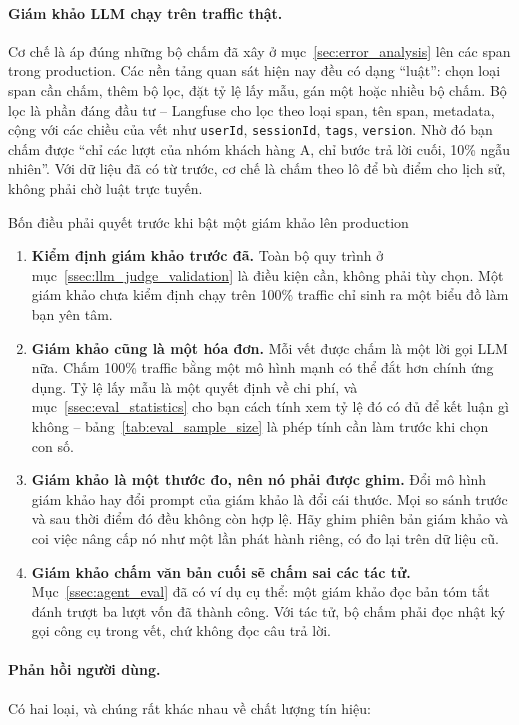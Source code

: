 \paragraph{Giám khảo LLM chạy trên traffic thật.} Cơ chế là áp đúng những bộ chấm đã xây ở mục~\ref{sec:error_analysis} lên các span trong production. Các nền tảng quan sát hiện nay đều có dạng ``luật'': chọn loại span cần chấm, thêm bộ lọc, đặt tỷ lệ lấy mẫu, gán một hoặc nhiều bộ chấm. Bộ lọc là phần đáng đầu tư -- Langfuse cho lọc theo loại span, tên span, metadata, cộng với các chiều của vết như \texttt{userId}, \texttt{sessionId}, \texttt{tags}, \texttt{version}. Nhờ đó bạn chấm được ``chỉ các lượt của nhóm khách hàng A, chỉ bước trả lời cuối, 10\% ngẫu nhiên''. Với dữ liệu đã có từ trước, cơ chế là chấm theo lô để bù điểm cho lịch sử, không phải chờ luật trực tuyến.

\begin{pitfall}{Bốn điều phải quyết trước khi bật một giám khảo lên production}
\begin{enumerate}
	\item \textbf{Kiểm định giám khảo trước đã.} Toàn bộ quy trình ở mục~\ref{ssec:llm_judge_validation} là điều kiện cần, không phải tùy chọn. Một giám khảo chưa kiểm định chạy trên 100\% traffic chỉ sinh ra một biểu đồ làm bạn yên tâm.
	\item \textbf{Giám khảo cũng là một hóa đơn.} Mỗi vết được chấm là một lời gọi LLM nữa. Chấm 100\% traffic bằng một mô hình mạnh có thể đắt hơn chính ứng dụng. Tỷ lệ lấy mẫu là một quyết định về chi phí, và mục~\ref{ssec:eval_statistics} cho bạn cách tính xem tỷ lệ đó có đủ để kết luận gì không -- bảng~\ref{tab:eval_sample_size} là phép tính cần làm trước khi chọn con số.
	\item \textbf{Giám khảo là một thước đo, nên nó phải được ghim.} Đổi mô hình giám khảo hay đổi prompt của giám khảo là đổi cái thước. Mọi so sánh trước và sau thời điểm đó đều không còn hợp lệ. Hãy ghim phiên bản giám khảo và coi việc nâng cấp nó như một lần phát hành riêng, có đo lại trên dữ liệu cũ.
	\item \textbf{Giám khảo chấm văn bản cuối sẽ chấm sai các tác tử.} Mục~\ref{ssec:agent_eval} đã có ví dụ cụ thể: một giám khảo đọc bản tóm tắt đánh trượt ba lượt vốn đã thành công. Với tác tử, bộ chấm phải đọc nhật ký gọi công cụ trong vết, chứ không đọc câu trả lời.
\end{enumerate}
\end{pitfall}

\paragraph{Phản hồi người dùng.} Có hai loại, và chúng rất khác nhau về chất lượng tín hiệu:

